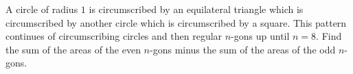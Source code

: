 A circle of radius $1$ is circumscribed by an equilateral triangle which is circumscribed by another circle which is circumscribed by a square. This pattern continues of circumscribing circles and then regular $n$-gons up until $n = 8$. Find the sum of the areas of the even $n$-gons minus the sum of the areas of the odd $n$-gons.
